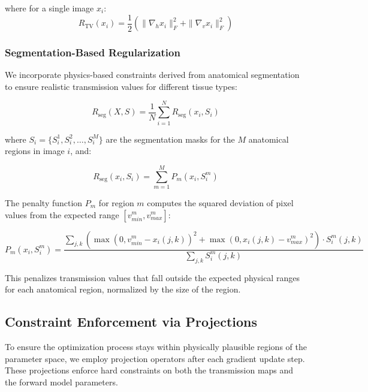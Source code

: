 \documentclass[nomenclature, english, bibtex]{kththesis}
\numberwithin{listing}{chapter}
\begin{document}
where for a single image $x_i$:
\begin{equation}
R_{\text{TV}}(x_i) = \frac{1}{2} \left( \|\nabla_h x_i\|_F^2 + \|\nabla_v x_i\|_F^2 \right)
\end{equation}


\subsubsection{Segmentation-Based Regularization}
We incorporate physics-based constraints derived from anatomical segmentation to ensure realistic transmission values for different tissue types:

\begin{equation}
R_{\text{seg}}(X, S) = \frac{1}{N} \sum_{i=1}^N R_{\text{seg}}(x_i, S_i)
\end{equation}

where $S_i = \{S_i^1, S_i^2, \ldots, S_i^M\}$ are the segmentation masks for the $M$ anatomical regions in image $i$, and:

\begin{equation}
R_{\text{seg}}(x_i, S_i) = \sum_{m=1}^{M} P_m(x_i, S_i^m)
\end{equation}

The penalty function $P_m$ for region $m$ computes the squared deviation of pixel values from the expected range $[v_{min}^m, v_{max}^m]$:

\begin{equation}
P_m(x_i, S_i^m) = \frac{\sum_{j, k} \left( \max(0, v_{min}^m - x_i(j,k))^2 + \max(0, x_i(j,k) - v_{max}^m)^2 \right) \cdot S_i^m(j,k)}{\sum_{j, k} S_i^m(j,k)}
\end{equation}

This penalizes transmission values that fall outside the expected physical ranges for each anatomical region, normalized by the size of the region.

\subsection{Constraint Enforcement via Projections}
To ensure the optimization process stays within physically plausible regions of the parameter space, we employ projection operators after each gradient update step. These projections enforce hard constraints on both the transmission maps and the forward model parameters.
\end{document}
